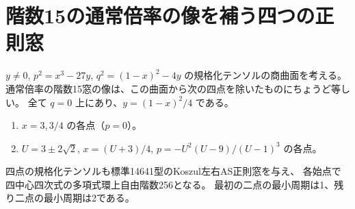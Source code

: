 \section{階数15の通常倍率の像を補う四つの正則窓}
\label{sec:rank-fifteen-formal-boundary}
\begin{theorem}\label{thm:rank-fifteen-formal-boundary}
$y\ne0$, $p^2=x^3-27y$, $q^2=(1-x)^2-4y$ の規格化テンソルの商曲面を考える。
通常倍率の階数15窓の像は、この曲面から次の四点を除いたものにちょうど等しい。
全て $q=0$ 上にあり、$y=(1-x)^2/4$ である。
\begin{enumerate}
\item $x=3,3/4$ の各点（$p=0$）。
\item $U=3\pm2\sqrt2$, $x=(U+3)/4$,
$p=-U^2(U-9)/(U-1)^3$ の各点。
\end{enumerate}
四点の規格化テンソルも標準14641型のKoszul左右AS正則窓を与え、
各始点で四中心四次式の多項式環上自由階数256となる。
最初の二点の最小周期は1、残り二点の最小周期は2である。
\end{theorem}
